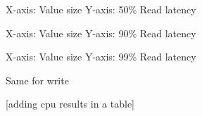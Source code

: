 X-axis: Value size
Y-axis: 50\% Read latency

X-axis: Value size
Y-axis: 90\% Read latency

X-axis: Value size
Y-axis: 99\% Read latency

Same for write

[adding cpu results in a table]











